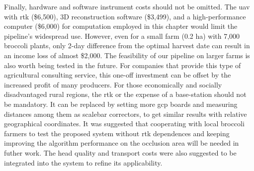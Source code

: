 Finally, hardware and software instrument costs should not be omitted. The \gls{uav} with \gls{rtk} (\$6,500), 3D reconstruction software (\$3,499), and a high-performance computer (\$6,000) for computation employed in this chapter would limit the pipeline's widespread use. However, even for a small farm (0.2 ha) with 7,000 broccoli plants, only 2-day difference from the optimal harvest date can result in an income loss of almost \$2,000. The feasibility of our pipeline on larger farms is also worth being tested in the future. For companies that provide this type of agricultural consulting service, this one-off investment can be offset by the increased profit of many producers. For those economically and socially disadvantaged rural regions, the \gls{rtk} or the expense of a base-station should not be mandatory. It can be replaced by setting more \gls{gcp} boards and measuring distances among them as scalebar correctors, to get similar results with relative geographical coordinates. It was suggested that cooperating with local broccoli farmers to test the proposed system without \gls{rtk} dependences and keeping improving the algorithm performance on the occlusion area will be needed in futher work. The head quality and transport costs were also suggested to be integrated into the system to refine its applicability.

\section{}



